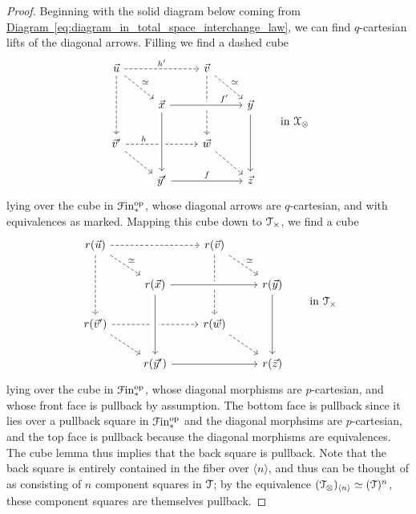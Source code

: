 \documentclass[main.tex]{subfiles}
\begin{document}
\begin{proof}
  Beginning with the solid diagram below coming from \hyperref[eq:diagram_in_total_space_interchange_law]{Diagram~\ref*{eq:diagram_in_total_space_interchange_law}}, we can find $q$-cartesian lifts of the diagonal arrows. Filling we find a dashed cube
  \begin{equation*}
    \begin{tikzcd}
      \vec{u}
      \arrow[rr, dashed, "h'"]
      \arrow[dd, dashed]
      \arrow[dr, dashed, "\simeq"]
      && \vec{v}
      \arrow[dd, dashed]
      \arrow[dr, dashed, "\simeq"]
      \\
      & \vec{x}
      \arrow[rr, crossing over, near end, "f'"]
      && \vec{y}
      \arrow[dd]
      \\
      \vec{v}'
      \arrow[rr, dashed, "h", near start]
      \arrow[dr, dashed]
      && \vec{w}
      \arrow[dr, dashed]
      \\
      & \vec{y}'
      \arrow[uu, near start, crossing over, leftarrow]
      \arrow[rr, "f"]
      && \vec{z}
    \end{tikzcd}
    \qquad \text{in }\category{X}_{\otimes}
  \end{equation*}
  lying over the cube in $\mathcal{F}\mathrm{in}_{*}^{\mathrm{op}}$, whose diagonal arrows are $q$-cartesian, and with equivalences as marked. Mapping this cube down to $\mathcal{T}_{\times}$, we find a cube
  \begin{equation*}
    \begin{tikzcd}
      r(\vec{u})
      \arrow[rr, dashed]
      \arrow[dd, dashed]
      \arrow[dr, dashed, "\simeq"]
      && r(\vec{v})
      \arrow[dd, dashed]
      \arrow[dr, dashed, "\simeq"]
      \\
      & r(\vec{x})
      \arrow[rr, crossing over, near end]
      && r(\vec{y})
      \arrow[dd]
      \\
      r(\vec{v}')
      \arrow[rr, dashed]
      \arrow[dr, dashed]
      && r(\vec{w})
      \arrow[dr, dashed]
      \\
      & r(\vec{y}')
      \arrow[uu, near start, crossing over, leftarrow]
      \arrow[rr]
      && r(\vec{z})
    \end{tikzcd}
    \qquad \text{in }\category{T}_{\times}
  \end{equation*}
  lying over the cube in $\mathcal{F}\mathrm{in}_{*}^{\mathrm{op}}$, whose diagonal morphisms are $p$-cartesian, and whose front face is pullback by assumption. The bottom face is pullback since it lies over a pullback square in $\mathcal{F}\mathrm{in}_{*}^{\mathrm{op}}$ and the diagonal morphsims are $p$-cartesian, and the top face is pullback because the diagonal morphisms are equivalences. The cube lemma thus implies that the back square is pullback. Note that the back square is entirely contained in the fiber over $\langle n \rangle$, and thus can be thought of as consisting of $n$ component squares in $\mathcal{T}$; by the equivalence $(\mathcal{T}_{\otimes})_{\langle n \rangle} \simeq (\mathcal{T})^{n}$, these component squares are themselves pullback.


\end{proof}
\end{document}
